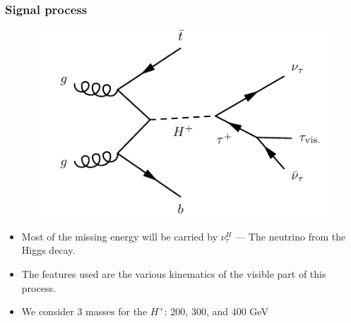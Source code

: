 \documentclass[9pt, lualatex]{beamer}
\begin{document}
\begin{frame}
    \frametitle{Signal process}
    \begin{figure}
        \centering
        \includegraphics[width=.5\textwidth]{heavyHplustaunu4fs.pdf}
    \end{figure}

    \begin{itemize}
        \item Most of the missing energy will be carried by $\nu_\tau^H$ --- The neutrino from the Higgs decay.
        \item The features used are the various kinematics of the visible part of this process.
        \item We consider 3 masses for the $H^+$: 200, 300, and 400 GeV
    \end{itemize}

\end{frame}
\end{document}
